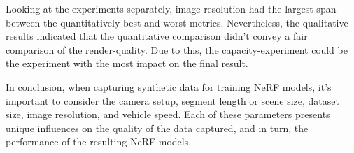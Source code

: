 Looking at the experiments separately, image resolution had the largest span between the quantitatively best and worst metrics. Nevertheless, the qualitative results indicated that the quantitative comparison didn't convey a fair comparison of the render-quality. Due to this, the capacity-experiment could be the experiment with the most impact on the final result.

In conclusion, when capturing synthetic data for training NeRF models, it's important to consider the camera setup, segment length or scene size, dataset size, image resolution, and vehicle speed. Each of these parameters presents unique influences on the quality of the data captured, and in turn, the performance of the resulting NeRF models.


\begin{comment}
The critical factors that must be considered when capturing synthetic data for training NeRF models, as inferred from the discussed baseline experiments, encompass camera setup, capacity, number of frames, image size, and vehicle speed. Each of these factors demonstrates a unique impact on the performance of the resulting models.

Camera setup plays a significant role in determining the quality of data captured for NeRF models. The experiments revealed that certain camera arrangements, specifically a setup with two cameras at -10$^{\circ}$ and 10$^{\circ}$ yaw, can result in superior SSIM and LPIPS scores, indicating more visually similar and perceptually pleasing images. This finding can be attributed to the degree of overlap between images captured by each camera in the setup. However, the experiments also highlight that camera arrangements were arbitrary and future research may investigate more realistic setups to better generalize the results.

The capacity, or the length of the road segment covered, also impacts the performance of the NeRF models. Even though longer segments led to lower scores across the metrics, these were still selected as the baseline to ensure a diverse range of environmental exposure for the model. It was noticed that the quality of renders deteriorated, especially in terms of increased blur, as segment length increased. Hence, the capacity of data has implications on the clarity and diversity of the training set, which could potentially influence the robustness of the model to diverse scenarios.

The number of frames in the dataset is another crucial factor. An optimal balance between the number of images and the image resolution is important for efficient training. In the experiments, a dataset with 225 images, each with a resolution of $600 \times 450$, covered approximately all of the input pixels by the end of training. However, a dataset with too many or too few images could result in either underutilization or overutilization of the pixels during training. Additionally, a decrease in PSNR with a drop in the number of frames points to the role of variety in the dataset.


\end{comment}
